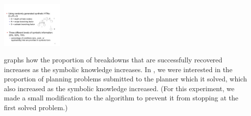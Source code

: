 \documentclass{llncs}
\begin{document}
\begin{floatingfigure}{1.25in}
\centerline{\includegraphics[width=1.2in]{figs/dimen}}
\vskip 4pt
\end{floatingfigure} 

 graphs how the proportion of breakdowns that are
successfully recovered increases as the symbolic knowledge
increases. In , we were interested in the proportion
of planning problems submitted to the planner which it solved, which
also increased as the symbolic knowledge increased.  (For this
experiment, we made a small modification to the algorithm to prevent it
from stopping at the first solved problem.)

\vskip 4pt


\end{document}
